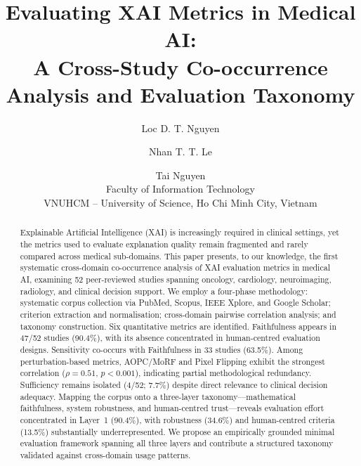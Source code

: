 \documentclass[10pt,twocolumn]{article}
\author{
Loc D. T. Nguyen \and
Nhan T. T. Le \and
Tai Nguyen \\
Faculty of Information Technology \\
VNUHCM -- University of Science, Ho Chi Minh City, Vietnam
}
\title{Evaluating XAI Metrics in Medical AI:\\
A Cross-Study Co-occurrence Analysis and Evaluation Taxonomy}
\date{}
\begin{document}
\maketitle

\begin{abstract}
Explainable Artificial Intelligence (XAI) is increasingly required in clinical settings, yet the metrics used to evaluate explanation quality remain fragmented and rarely compared across medical sub-domains. This paper presents, to our knowledge, the first systematic cross-domain co-occurrence analysis of XAI evaluation metrics in medical AI, examining 52 peer-reviewed studies spanning oncology, cardiology, neuroimaging, radiology, and clinical decision support. We employ a four-phase methodology: systematic corpus collection via PubMed, Scopus, IEEE Xplore, and Google Scholar; criterion extraction and normalisation; cross-domain pairwise correlation analysis; and taxonomy construction. Six quantitative metrics are identified. Faithfulness appears in 47/52 studies (90.4\%), with its absence concentrated in human-centred evaluation designs. Sensitivity co-occurs with Faithfulness in 33 studies (63.5\%). Among perturbation-based metrics, AOPC/MoRF and Pixel Flipping exhibit the strongest correlation ($\rho = 0.51$, $p < 0.001$), indicating partial methodological redundancy. Sufficiency remains isolated (4/52; 7.7\%) despite direct relevance to clinical decision adequacy. Mapping the corpus onto a three-layer taxonomy---mathematical faithfulness, system robustness, and human-centred trust---reveals evaluation effort concentrated in Layer~1 (90.4\%), with robustness (34.6\%) and human-centred criteria (13.5\%) substantially underrepresented. We propose an empirically grounded minimal evaluation framework spanning all three layers and contribute a structured taxonomy validated against cross-domain usage patterns.
\end{abstract}









\end{document}
